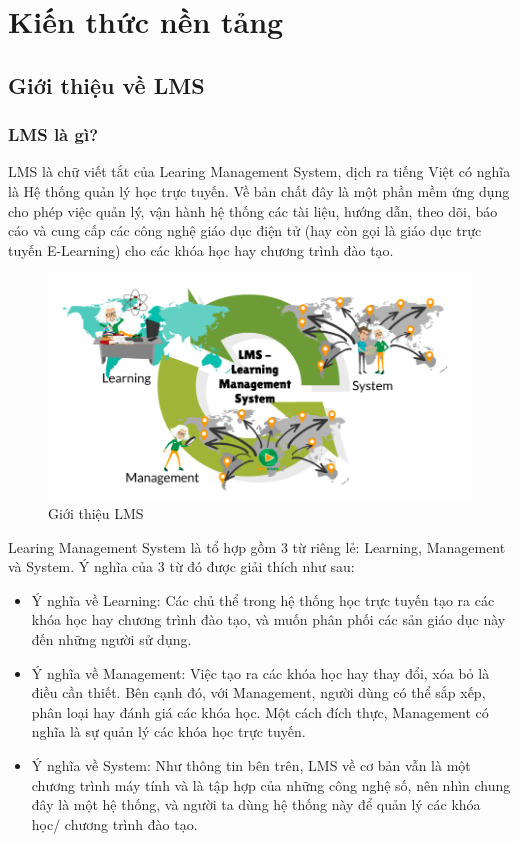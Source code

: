\setcounter{chapter}{1}
\fontsize{13}{5}\selectfont
\chapter{Kiến thức nền tảng}
\section{Giới thiệu về LMS \cite{lms}}
\subsection{LMS là gì?}
LMS là chữ viết tắt của Learing Management System, dịch ra tiếng Việt có nghĩa là Hệ thống quản lý học trực tuyến. Về bản chất đây là một phần mềm ứng dụng cho phép việc quản lý, vận hành hệ thống các tài liệu, hướng dẫn, theo dõi, báo cáo và cung cấp các công nghệ giáo dục điện tử (hay còn gọi là giáo dục trực tuyến E-Learning) cho các khóa học hay chương trình đào tạo.
\begin{center}
	\begin{figure}[htp]
		\begin{center}
			\includegraphics[scale=.5]{img/LMS}
		\end{center}
		\caption{Giới thiệu LMS}
		\label{refhinh1}
	\end{figure}
\end{center}
Learing Management System là tổ hợp gồm 3 từ riêng lẻ: Learning, Management và System. Ý nghĩa của 3 từ đó được giải thích như sau:
\begin{itemize}
	\item Ý nghĩa về Learning: Các chủ thể trong hệ thống học trực tuyến tạo ra các khóa học hay chương trình đào tạo, và muốn phân phối các sản giáo dục này đến những người sử dụng.
	\item Ý nghĩa về Management: Việc tạo ra các khóa học hay thay đổi, xóa bỏ là điều cần thiết. Bên cạnh đó, với Management, người dùng có thể sắp xếp, phân loại hay đánh giá các khóa học. Một cách đích thực, Management có nghĩa là sự quản lý các khóa học trực tuyến.
	\item Ý nghĩa về System: Như thông tin bên trên, LMS về cơ bản vẫn là một chương trình máy tính và là tập hợp của những công nghệ số, nên nhìn chung đây là một hệ thống, và người ta dùng hệ thống này để quản lý các khóa học/ chương trình đào tạo.
\end{itemize}
